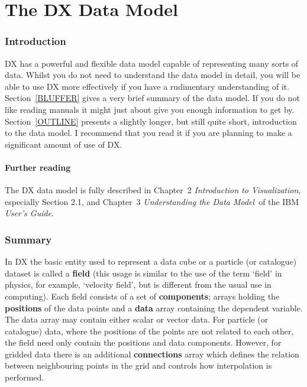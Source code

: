 \documentclass[twoside,11pt]{article}
\newcommand{\stardocinitials}  {SC}
\newcommand{\stardocnumber}    {2.3}
\newcommand{\stardocname}{\stardocinitials /\stardocnumber}
\newcommand{\xlabel}[1]{}
\begin{document}
\part{The DX Data Model}
\markboth{\stardocname}{\stardocname}
\section{\xlabel{INTRO_DATMOD}Introduction}

DX has a powerful and flexible data model capable of representing many
sorts of data. Whilst you do not need to understand the data model in
detail, you will be able to use DX more effectively if you have a
rudimentary understanding of it. Section~\ref{BLUFFER} gives a very
brief summary of the data model. If you do not like reading manuals
it might just about give you enough information to get by.
Section~\ref{OUTLINE} presents a slightly longer, but still quite short,
introduction to the data model. I recommend that you read it if you are
planning to make a significant amount of use of DX.

\subsection{Further reading}

The DX data model is fully described in Chapter~2 {\it Introduction
to Visualization}, especially Section 2.1, and Chapter~3 {\it Understanding
the Data Model}\, of the IBM {\it User's Guide}\cite{USERG}.


\section{\xlabel{BLUFFER}\label{BLUFFER}Summary}


In DX the basic entity used to represent a data cube or a particle (or
catalogue) dataset is called a {\bf field} (this usage is similar to the
use of the term `field' in physics, for example, `velocity field', but
is different from the usual use in computing). Each field consists of a
set of {\bf components}; arrays holding the {\bf positions} of the data
points and a {\bf data} array containing the dependent variable. The
data array may contain either scalar or vector data. For particle (or
catalogue) data, where the positions of the points are not related to
each other, the field need only contain the positions and data
components. However, for gridded data there is an additional {\bf
connections} array which defines the relation between neighbouring
points in the grid and controls how interpolation is performed.
\end{document}
